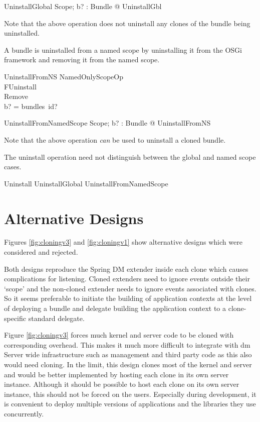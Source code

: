 \documentclass[a4paper,12pt]{article}
\begin{document}
\begin{zed}
UninstallGlobal  \exists \Delta Scope; b? : Bundle @ UninstallGbl \\
\end{zed}
Note that the above operation does not uninstall any clones of the bundle being uninstalled.

A bundle is uninstalled from a named scope by uninstalling it from the OSGi framework and
removing it from the named scope.
\begin{schema}{UninstallFromNS}
NamedOnlyScopeOp \\
FUninstall \\
Remove \\
\where
b? = bundles~id? \\
\end{schema}

\begin{zed}
UninstallFromNamedScope  \exists \Delta Scope; b? : Bundle @ UninstallFromNS \\
\end{zed}
Note that the above operation \textit{can} be used to uninstall a cloned bundle.

The uninstall operation need not distinguish between the global and named scope cases.
\begin{zed}
Uninstall  UninstallGlobal \lor UninstallFromNamedScope \\
\end{zed}

\clearpage
\section{Alternative Designs}

Figures \ref{fig:cloningv3} and \ref{fig:cloningv1} show alternative designs which were considered
and rejected.

Both designs reproduce the Spring DM extender inside each clone which causes complications for
listening.
Cloned extenders need to ignore events outside their `scope' and the non-cloned extender
needs to ignore events associated with clones.
So it seems preferable to initiate the building of application contexts at the level of deploying a bundle and delegate building the application context to a clone-specific standard delegate.

Figure \ref{fig:cloningv3} forces much kernel and server code to be cloned with corresponding
overhead. This makes it much more difficult to integrate with dm Server wide infrastructure such as
management and third party code as this also would need cloning.
In the limit, this design clones most of the kernel and server and would be better implemented by
hosting each clone in its own server instance.
Although it should be possible to host each clone on its own server instance, this should not be forced
on the users.
Especially during development, it is convenient to deploy multiple versions of applications and the
libraries they use concurrently.
\end{document}
